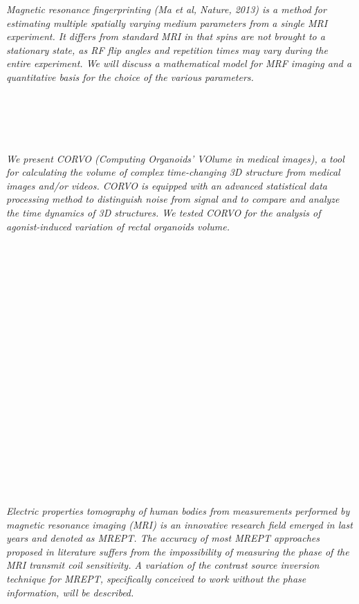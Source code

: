   \begin{multicols}{2}
    \textit{Magnetic resonance fingerprinting (Ma et al, Nature, 2013) is a method for estimating multiple spatially varying medium parameters from a single MRI experiment. It differs from standard MRI in that spins are not brought to a stationary state, as RF flip angles and repetition times may vary during the entire experiment.  We will discuss a mathematical model for MRF imaging and a quantitative basis for the choice of the various parameters.}\\
\\ 
      \\
      \\\\
\\
    \textit{We present CORVO (Computing Organoids’ VOlume in medical images), a tool for calculating the volume of complex time-changing 3D structure from medical images and/or videos. CORVO is equipped with an advanced statistical data processing method to distinguish noise from signal and to compare and analyze the time dynamics of 3D structures. We tested CORVO for the analysis of agonist-induced variation of rectal organoids volume.}\\
\\ 
      \\
      \\\\
      \\
      \\\\
      \\
      \\\\
      \\
      \\\\
      \\
      \\\\
      \\
      \\\\
\\
    \textit{Electric properties tomography of human bodies from measurements performed by magnetic resonance imaging (MRI) is an innovative research field emerged in last years and denoted as MREPT. The accuracy of most MREPT approaches proposed in literature suffers from the impossibility of measuring the phase of the MRI transmit coil sensitivity. A variation of the contrast source inversion technique for MREPT, specifically conceived to work without the phase information, will be described.}\\

\end{multicols}
